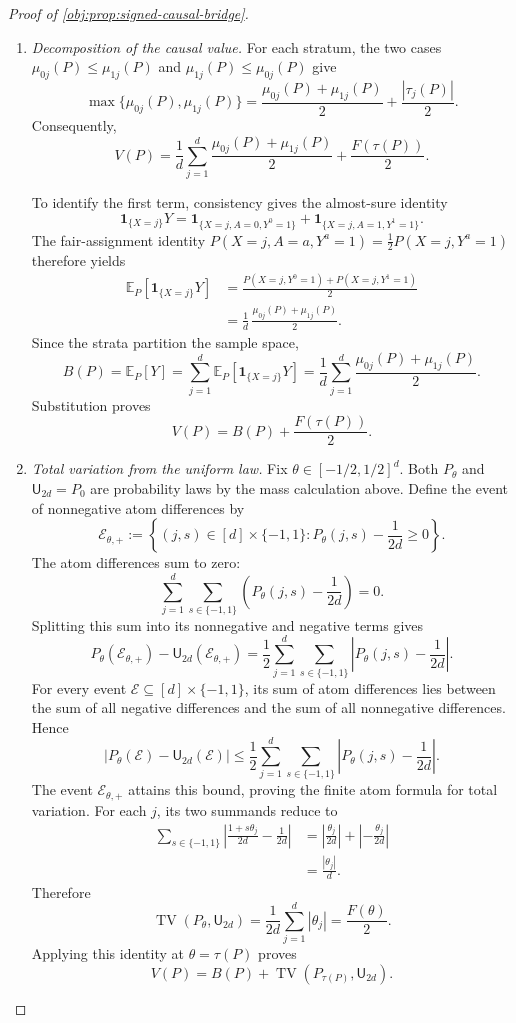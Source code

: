 \documentclass[11pt]{article}
\begin{document}
\begin{proof}[Proof of \cref{obj:prop:signed-causal-bridge}]
\begin{enumerate}
\item \emph{Decomposition of the causal value.}
For each stratum, the two cases
\(\mu_{0j}(P)\le\mu_{1j}(P)\) and
\(\mu_{1j}(P)\le\mu_{0j}(P)\) give
\[
\max\{\mu_{0j}(P),\mu_{1j}(P)\}
=\frac{\mu_{0j}(P)+\mu_{1j}(P)}2
+\frac{|\tau_j(P)|}2.
\]
Consequently,
\[
V(P)
=\frac1d\sum_{j=1}^d
 \frac{\mu_{0j}(P)+\mu_{1j}(P)}2
+\frac{F(\tau(P))}2.
\]

To identify the first term, consistency gives the almost-sure identity
\[
\mathbf1_{\{X=j\}}Y
=\mathbf1_{\{X=j,A=0,Y^0=1\}}
+\mathbf1_{\{X=j,A=1,Y^1=1\}}.
\]
The fair-assignment identity
\(P(X=j,A=a,Y^a=1)=\frac12P(X=j,Y^a=1)\)
therefore yields
\[
\begin{aligned}
\mathbb E_P[\mathbf1_{\{X=j\}}Y]
&=\frac{P(X=j,Y^0=1)+P(X=j,Y^1=1)}2\\
&=\frac1d\,\frac{\mu_{0j}(P)+\mu_{1j}(P)}2.
\end{aligned}
\]
Since the strata partition the sample space,
\[
B(P)=\mathbb E_P[Y]
=\sum_{j=1}^d\mathbb E_P[\mathbf1_{\{X=j\}}Y]
=\frac1d\sum_{j=1}^d
 \frac{\mu_{0j}(P)+\mu_{1j}(P)}2.
\]
Substitution proves
\[
V(P)=B(P)+\frac{F(\tau(P))}2.
\]

\item \emph{Total variation from the uniform law.}
Fix \(\theta\in[-1/2,1/2]^d\). Both \(P_\theta\) and
\(\mathsf U_{2d}=P_0\) are probability laws by the mass calculation above.
Define the event of nonnegative atom differences by
\[
\mathcal E_{\theta,+}
:=\left\{(j,s)\in[d]\times\{-1,1\}:
P_\theta(j,s)-\frac1{2d}\ge0\right\}.
\]
The atom differences sum to zero:
\[
\sum_{j=1}^d\sum_{s\in\{-1,1\}}
\left(P_\theta(j,s)-\frac1{2d}\right)=0.
\]
Splitting this sum into its nonnegative and negative terms gives
\[
P_\theta(\mathcal E_{\theta,+})
-\mathsf U_{2d}(\mathcal E_{\theta,+})
=\frac12\sum_{j=1}^d\sum_{s\in\{-1,1\}}
\left|P_\theta(j,s)-\frac1{2d}\right|.
\]
For every event \(\mathcal E\subseteq[d]\times\{-1,1\}\), its sum of atom
differences lies between the sum of all negative differences and the sum
of all nonnegative differences. Hence
\[
\left|P_\theta(\mathcal E)-\mathsf U_{2d}(\mathcal E)\right|
\le\frac12\sum_{j=1}^d\sum_{s\in\{-1,1\}}
\left|P_\theta(j,s)-\frac1{2d}\right|.
\]
The event \(\mathcal E_{\theta,+}\) attains this bound, proving the finite
atom formula for total variation. For each \(j\), its two summands reduce to
\[
\begin{aligned}
\sum_{s\in\{-1,1\}}
\left|\frac{1+s\theta_j}{2d}-\frac1{2d}\right|
&=\left|\frac{\theta_j}{2d}\right|
+\left|-\frac{\theta_j}{2d}\right|\\
&=\frac{|\theta_j|}{d}.
\end{aligned}
\]
Therefore
\[
\operatorname{TV}(P_\theta,\mathsf U_{2d})
=\frac1{2d}\sum_{j=1}^d|\theta_j|
=\frac{F(\theta)}2.
\]
Applying this identity at \(\theta=\tau(P)\) proves
\[
V(P)=B(P)+\operatorname{TV}(P_{\tau(P)},\mathsf U_{2d}).
\]


\end{enumerate}
\end{proof}
\end{document}
